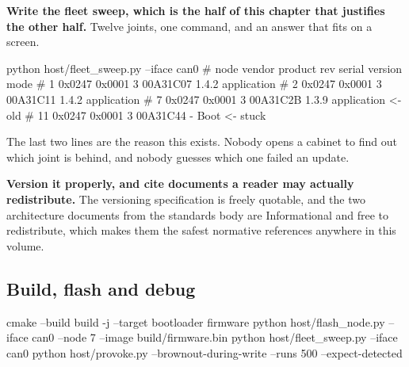 \begin{steps}
\item \textbf{Write the fleet sweep, which is the half of this chapter that
justifies the other half.} Twelve joints, one command, and an answer that fits
on a screen.
\begin{shellcode}
python host/fleet_sweep.py --iface can0
# node  vendor   product  rev   serial     version        mode
#    1  0x0247   0x0001   3     00A31C07   1.4.2          application
#    2  0x0247   0x0001   3     00A31C11   1.4.2          application
#    7  0x0247   0x0001   3     00A31C2B   1.3.9          application  <- old
#   11  0x0247   0x0001   3     00A31C44   -              Boot         <- stuck
\end{shellcode}
The last two lines are the reason this exists. Nobody opens a cabinet to find
out which joint is behind, and nobody guesses which one failed an update.

\item \textbf{Version it properly, and cite documents a reader may actually
redistribute.} The versioning specification is freely quotable, and the two
architecture documents from the standards body are Informational and free to
redistribute, which makes them the safest normative references anywhere in this
volume.
\end{steps}


\subsection*{Build, flash and debug}


\begin{shellcode}
cmake --build build -j --target bootloader firmware
python host/flash_node.py --iface can0 --node 7 --image build/firmware.bin
python host/fleet_sweep.py --iface can0
python host/provoke.py --brownout-during-write --runs 500 --expect-detected
\end{shellcode}

